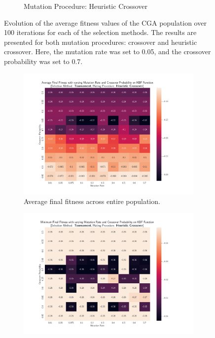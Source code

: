 \documentclass[10pt]{article}
\begin{document}
\begin{multicols}{2}
\begin{figure}[H]
\begin{subfigure}{0.44\textwidth}
        \caption{Mutation Procedure: Heuristic Crossover}
    \end{subfigure}
    \captionsetup{justification=centering}
    \caption{Evolution of the average fitness values of the CGA population over 100 iterations for each of the selection methods. The results are presented for both mutation procedures: crossover and heuristic crossover. Here, the mutation rate was set to 0.05, and the crossover probability was set to 0.7.}
    \label{fig:CGA_fitness_evo}
\end{figure}

\begin{figure}[H]
    \centering
    \begin{subfigure}{0.46\textwidth}
        \includegraphics[width=\textwidth]{../figures/Ungenerated Images/AVGContour_Tournament_Heuristic Crossover.png}
        \caption{Average final fitness across entire population.}
        \label{fig:CGA_contour_tournament_Heuristic Crossover_AVG}
    \end{subfigure}
    \begin{subfigure}{0.46\textwidth}
        \includegraphics[width=\textwidth]{../figures/Ungenerated Images/MINContour_Tournament_Heuristic Crossover.png}

\end{subfigure}
\end{figure}
\end{multicols}
\end{document}
